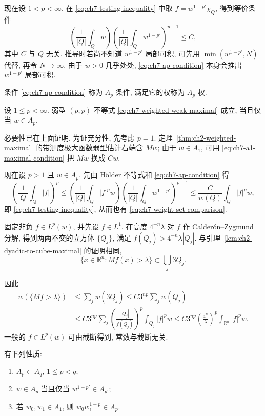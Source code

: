 \hypertarget{chapter-07-page-147}{}
现在设 $1<p<\infty$. 在 \eqref{eq:ch7-testing-inequality} 中取 $f=w^{1-p'}\chi_Q$, 得到等价条件
\begin{equation}
\label{eq:ch7-ap-condition}
 \left(\frac1{|Q|}\int_Qw\right)
 \left(\frac1{|Q|}\int_Qw^{1-p'}\right)^{p-1}\le C,
\end{equation}
其中 $C$ 与 $Q$ 无关. 推导时若尚不知道 $w^{1-p'}$ 局部可积, 可先用 $\min(w^{1-p'},N)$ 代替, 再令 $N\to\infty$. 由于 $w>0$ 几乎处处, \eqref{eq:ch7-ap-condition} 本身会推出 $w^{1-p'}$ 局部可积.

条件 \eqref{eq:ch7-ap-condition} 称为 $A_p$ 条件, 满足它的权称为 $A_p$ 权.

\begin{Theorem}
\label{thm:ch7-maximal-weighted-weak}
设 $1\le p<\infty$. 弱型 $(p,p)$ 不等式 \eqref{eq:ch7-weighted-weak-maximal} 成立, 当且仅当 $w\in A_p$.
\end{Theorem}

\begin{Proof}
必要性已在上面证明. 为证充分性, 先考虑 $p=1$. 定理~\ref{thm:ch2-weighted-maximal} 的带测度极大函数弱型估计右端含 $Mw$; 由于 $w\in A_1$, 可用 \eqref{eq:ch7-a1-maximal-condition} 把 $Mw$ 换成 $Cw$.

现在设 $p>1$ 且 $w\in A_p$. 先由 Hölder 不等式和 \eqref{eq:ch7-ap-condition} 得
\[
 \left(\frac1{|Q|}\int_Q|f|\right)^p
 \le\left(\frac1{|Q|}\int_Q|f|^pw\right)
 \left(\frac1{|Q|}\int_Qw^{1-p'}\right)^{p-1}
 \le\frac C{w(Q)}\int_Q|f|^pw,
\]
即 \eqref{eq:ch7-testing-inequality}, 从而也有 \eqref{eq:ch7-weight-set-comparison}.

固定非负 $f\in L^p(w)$, 并先设 $f\in L^1$. 在高度 $4^{-n}\lambda$ 对 $f$ 作 Calderón--Zygmund 分解, 得到两两不交的立方体 $\{Q_j\}$, 满足 $f(Q_j)>4^{-n}\lambda|Q_j|$. 与引理~\ref{lem:ch2-dyadic-to-cube-maximal} 的证明相同,
\[
 \{x\in\mathbb R^n:Mf(x)>\lambda\}\subset\bigcup_j3Q_j.
\]

\hypertarget{chapter-07-page-148}{}
因此
\[
\begin{aligned}
 w(\{Mf>\lambda\})
 &\le\sum_jw(3Q_j)
 \le C3^{np}\sum_jw(Q_j)\\
 &\le C3^{np}\sum_j\left(\frac{|Q_j|}{f(Q_j)}\right)^p
 \int_{Q_j}|f|^pw
 \le C3^{np}\left(\frac{4^n}\lambda\right)^p
 \int_{\mathbb R^n}|f|^pw.
\end{aligned}
\]
一般的 $f\in L^p(w)$ 可由截断得到, 常数与截断无关.
\end{Proof}

\begin{Proposition}
\label{prop:ch7-ap-properties}
有下列性质:
\begin{enumerate}[label=(\arabic*)]
\item $A_p\subset A_q$, $1\le p<q$;
\item $w\in A_p$ 当且仅当 $w^{1-p'}\in A_{p'}$;
\item 若 $w_0,w_1\in A_1$, 则 $w_0w_1^{1-p}\in A_p$.
\end{enumerate}
\end{Proposition}


